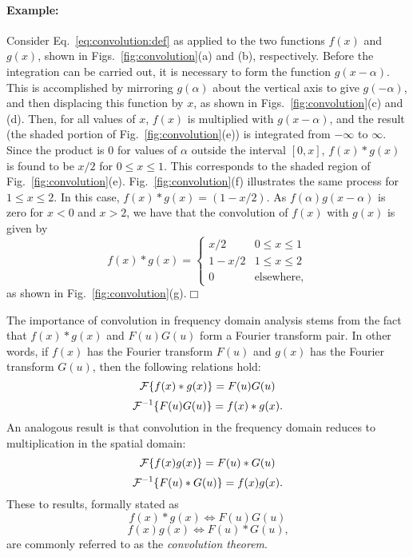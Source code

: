 \paragraph{Example:} Consider Eq.~\ref{eq:convolution:def} as applied
to the two functions $f(x)$ and $g(x)$, shown in
Figs.~\ref{fig:convolution}(a) and (b), respectively.  Before the
integration can be carried out, it is necessary to form the function
$g(x-\alpha)$.  This is accomplished by mirroring $g(\alpha)$ about
the vertical axis to give $g(-\alpha)$, and then displacing this
function by $x$, as shown in Figs.~\ref{fig:convolution}(c) and (d).
Then, for all values of $x$, $f(x)$ is multiplied with $g(x-\alpha)$,
and the result (the shaded portion of Fig.~\ref{fig:convolution}(e))
is integrated from $-\infty$ to $\infty$.  Since the product is $0$
for values of $\alpha$ outside the interval $[0,x]$, $f(x)\ast g(x)$
is found to be $x/2$ for $0\leq x\leq 1$.  This corresponds to the
shaded region of Fig.~\ref{fig:convolution}(e).
Fig.~\ref{fig:convolution}(f) illustrates the same process for $1\leq
x\leq 2$.  In this case, $f(x)\ast g(x)=(1-x/2)$.  As
$f(\alpha)g(x-\alpha)$ is zero for $x<0$ and $x>2$, we have that the
convolution of $f(x)$ with $g(x)$ is given by
\begin{equation}
  f(x)\ast g(x)=\left\{\begin{array}{ll}
                         x/2   & 0\leq x\leq 1 \\
                         1-x/2 & 1\leq x\leq 2 \\
                         0     & \mbox{elsewhere,}
                       \end{array}\right.
\end{equation}
as shown in Fig.~\ref{fig:convolution}(g).\hfill$\Box$
\vspace*{0.5cm}

The importance of convolution in frequency domain analysis stems from
the fact that $f(x)\ast g(x)$ and $F(u)G(u)$ form a Fourier transform
pair.  In other words, if $f(x)$ has the Fourier transform $F(u)$ and
$g(x)$ has the Fourier transform $G(u)$, then the following relations
hold:
\begin{equation}
  {\cal F}\{f(x)\ast g(x)\}=F(u)G(u)
\end{equation}
\begin{equation}
  {\cal F}^{-1}\{F(u)G(u)\}=f(x)\ast g(x)\mbox{.}
\end{equation}
An analogous result is that convolution in the frequency domain
reduces to multiplication in the spatial domain:
\begin{equation}
  {\cal F}\{f(x)g(x)\}=F(u)\ast G(u)
\end{equation}
\begin{equation}
  {\cal F}^{-1}\{F(u)\ast G(u)\}=f(x)g(x)\mbox{.}
\end{equation}
These to results, formally stated as
\begin{equation}
  f(x)\ast g(x)\Leftrightarrow F(u)G(u)
\end{equation}
\begin{equation}
  f(x)g(x)\Leftrightarrow F(u)\ast G(u)\mbox{,}
\end{equation}
are commonly referred to as the {\em convolution theorem\/}.

